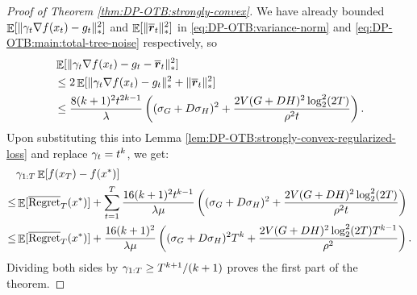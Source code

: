 \begin{proof}[Proof of Theorem \ref{thm:DP-OTB:strongly-convex}]
We have already bounded $\mathop{\mathbb{E}}[\|\gamma_t\nabla f(x_t)-g_t\|_*^2]$ and $\mathop{\mathbb{E}}[\|\overline{{\boldsymbol{r}}}_t\|_*^2]$ in \eqref{eq:DP-OTB:variance-norm} and \eqref{eq:DP-OTB:main:total-tree-noise} respectively, so
\begin{align*}
    &\mathop{\mathbb{E}}[\|\gamma_t\nabla f(x_t)-g_t-\overline{{\boldsymbol{r}}}_t\|_*^2] \\
    &\leq 2\mathop{\mathbb{E}}[\|\gamma_t\nabla f(x_t)-g_t\|_*^2+\|\overline{{\boldsymbol{r}}}_t\|_*^2] \\
    &\leq \frac{8(k+1)^2t^{2k-1}}{\lambda}\left((\sigma_G+D\sigma_H)^2+ \frac{2V(G+DH)^2\log_2^2(2T)}{\rho^2 t}\right).
\end{align*}
Upon substituting this into Lemma \ref{lem:DP-OTB:strongly-convex-regularized-loss} and replace $\gamma_t=t^k$, we get:
\begin{align*}
    &\gamma_{1:T} \mathop{\mathbb{E}}[ f(x_T)- f(x^*)] \\
    \leq & \mathop{\mathbb{E}}[\overline{\mathrm{Regret}}_T(x^*)] + \sum_{t=1}^T \frac{16(k+1)^2t^{k-1}}{\lambda\mu}\left((\sigma_G+D\sigma_H)^2+ \frac{2V(G+DH)^2\log_2^2(2T)}{\rho^2 t}\right) \\
    \leq & \mathop{\mathbb{E}}[\overline{\mathrm{Regret}}_T(x^*)] + \frac{16(k+1)^2}{\lambda \mu} \left( (\sigma_G+D\sigma_H)^2T^k + \frac{2V(G+DH)^2\log_2^2(2T)T^{k-1}}{\rho^2} \right).
\end{align*}
Dividing both sides by $\gamma_{1:T} \geq T^{k+1}/(k+1)$ proves the first part of the theorem.


\end{proof}
